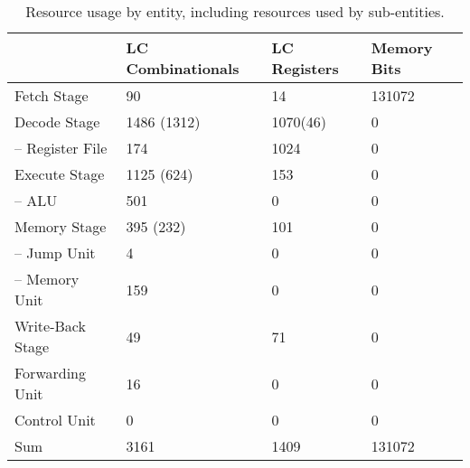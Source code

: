 \begin{table}[htb]
  \centering
  \caption{Resource usage by entity, including resources used by sub-entities.}
  \begin{tabular}{llll}
    \toprule
                         & LC Combinationals & LC Registers & Memory Bits \\
    \midrule
    Fetch Stage          & 90                & 14           & 131072      \\
    Decode Stage         & 1486 (1312)       & 1070(46)     & 0           \\
    -- Register File     & 174               & 1024         & 0           \\
    Execute Stage        & 1125 (624)        & 153          & 0           \\
    -- ALU               & 501               & 0            & 0           \\
    Memory Stage         & 395 (232)         & 101          & 0           \\
    -- Jump Unit         & 4                 & 0            & 0           \\
    -- Memory Unit       & 159               & 0            & 0           \\
    Write-Back Stage     & 49                & 71           & 0           \\
    Forwarding Unit      & 16                & 0            & 0           \\
    Control Unit         & 0                 & 0            & 0           \\
    \cmidrule{1-4}
    Sum                  & 3161              & 1409         & 131072      \\
    \bottomrule
  \end{tabular}
\end{table}

\begin{qa}
  \answer{}
\end{qa}
